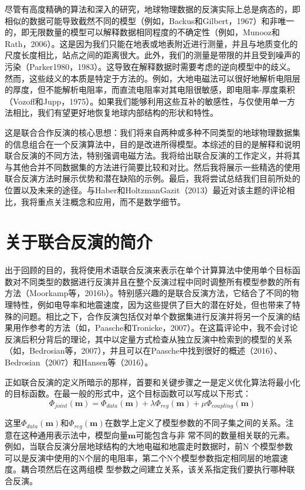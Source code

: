 尽管有高度精确的算法和深入的研究，地球物理数据的反演实际上总是病态的，即相似的数据可能导致截然不同的模型（例如，Backus和Gilbert，1967）和非唯一的，即无限数量的模型可以解释数据相同程度的不确定性（例如，Munooz和Rath，2006）。这是因为我们只能在地表或地表附近进行测量，并且与地质变化的尺度长度相比，站点之间的距离很大。此外，我们的测量是带限的并且受到噪声的污染（Parker1980，1983）。这导致在解释数据时需要考虑的逆向模型中的歧义。然而，这些歧义的本质是特定于方法的。例如，大地电磁法可以很好地解析电阻层的厚度，但不能解析电阻率，而直流电阻率对其电阻很敏感，即电阻率-厚度乘积（Vozoff和Jupp，1975）。如果我们能够利用这些互补的敏感性，与仅使用单一方法相比，我们有望更好地恢复地球内部结构的形状和特性。

这是联合合作反演的核心思想：我们将来自两种或多种不同类型的地球物理数据集的信息组合在一个反演算法中，目的是改进所得模型。本综述的目的是解释和说明联合反演的不同方法，特别强调电磁方法。我将给出联合反演的工作定义，并将其与其他合并不同数据集的方法进行简要比较和对比。然后我将展示一些精选的使用联合反演方法时展示优势和潜在缺陷的示例。最后，我将尝试总结我们目前所处的位置以及未来的途径。与Haber和HoltzmanGazit（2013）最近对该主题的评论相比，我将重点关注概念和应用，而不是数学细节。

\section{关于联合反演的简介}

出于回顾的目的，我将使用术语联合反演来表示在单个计算算法中使用单个目标函数对不同类型的数据进行反演并且在整个反演过程中同时调整所有模型参数的所有方法（Moorkamp等，2016b）。特别感兴趣的是联合反演方法，它结合了不同的物理特性，例如电导率和地震速度，因为这些提供了巨大的潜在好处，但也带来了特殊的问题。相比之下，合作反演包括仅对单个数据集进行反演并将另一个反演的结果用作参考的方法（如，Paasche和Tronicke，2007）。在这篇评论中，我不会讨论反演后积分背后的理论，其中以定量方式检查从独立反演中检索到的模型的关系（如，Bedrosian等，2007），并且可以在Paasche中找到很好的概述（2016）、Bedrosian（2007）和Hansen等（2016）。

正如联合反演的定义所暗示的那样，首要和关键步骤之一是定义优化算法将最小化的目标函数。在最一般的形式中，这个目标函数可以写成以下形式：
\begin{equation}
    \Phi_{joint}(\mathbf{m}) = \Phi_{data}(\mathbf{m}) +\lambda \Phi_{reg}(\mathbf{m})+\mu \Phi_{coupling}(\mathbf{m})
\end{equation}

这里$\Phi_{data}(\mathbf{m})$和$\Phi_{reg}(\mathbf{m})$在数学上定义了模型参数的不同子集之间的关系。注意在这种通用表示法中，模型向量$\mathbf{m}$可能包含与非 常不同的数量相关联的元素。例如，当联合反演分层地球结构的大地电磁和地震走时数据时，前N 个模型参数 可以是反演中使用的N个层的电阻率，第二个N个模型参数指定相同层的地震速度。耦合项然后在这两组模 型参数之间建立关系，该关系指定我们要执行哪种联合反演。

